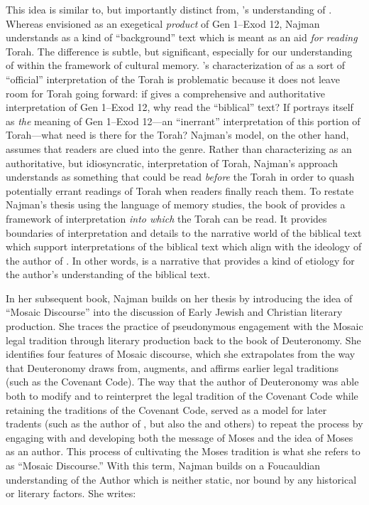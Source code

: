 This idea is similar to, but importantly distinct from, \vanderkam's understanding of \jub. Whereas \vanderkam envisioned \jub as an exegetical \emph{product} of Gen 1--Exod 12, Najman understands \jub as a kind of ``background'' text which is meant as an aid \emph{for reading} Torah. The difference is subtle, but significant, especially for our understanding of \jub within the framework of cultural memory. \vanderkam's characterization of \jub as a sort of ``official'' interpretation of the Torah is problematic because it does not leave room for Torah going forward: if \jub gives a comprehensive and authoritative interpretation of Gen 1--Exod 12, why read the ``biblical'' text? If \jub portrays itself as \emph{the} meaning of Gen 1--Exod 12---an ``inerrant'' interpretation of this portion of Torah---what need is there for the Torah? Najman's model, on the other hand, assumes that readers are clued into the genre. Rather than  characterizing \jub as an authoritative, but idiosyncratic, interpretation of Torah, Najman's approach understands \jub as something that could be read \emph{before} the Torah in order to quash potentially errant readings of Torah when readers finally reach them.%
    \autocite[408]{najman_jsj1999} 
To restate Najman's thesis using the language of memory studies, the book of \jub provides a framework of interpretation \emph{into which} the Torah can be read. It provides boundaries of interpretation and details to the narrative world of the biblical text which support interpretations of the biblical text which align with the ideology of the author of \jub. In other words, \jub is a narrative that provides a kind of etiology for the author's understanding of the biblical text. 

In her subsequent book, Najman builds on her thesis by introducing the idea of ``Mosaic Discourse'' into the discussion of Early Jewish and Christian literary production. She traces the practice of pseudonymous engagement with the Mosaic legal tradition through literary production back to the book of Deuteronomy.\autocite[48]{najman2003} She identifies four features of Mosaic discourse, which she extrapolates from the way that Deuteronomy draws from, augments, and affirms earlier legal traditions (such as the Covenant Code). The way that the author of Deuteronomy was able both to modify and to reinterpret the legal tradition of the Covenant Code while retaining the traditions of the Covenant Code, served as a model for later tradents (such as the author of \jub, but also the \templescroll and others) to repeat the process by engaging with and developing both the message of Moses and the idea of Moses as an author. This process of cultivating the Moses tradition is what she refers to as ``Mosaic Discourse.'' With this term, Najman builds on a Foucauldian understanding of the Author which is neither static, nor bound by any historical or literary factors. She writes:

